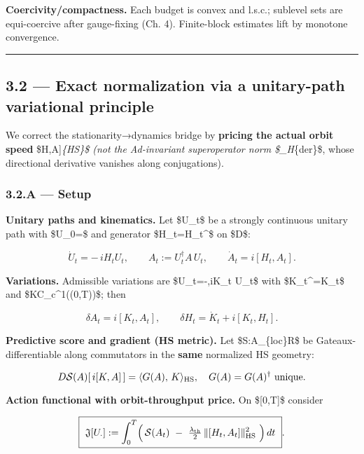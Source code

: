 \documentclass[
]{article}
\numberwithin{equation}{section}
\begin{document}
\textbf{Coercivity/compactness.} Each budget is convex and l.s.c.;
sublevel sets are equi-coercive after gauge-fixing (Ch. 4). Finite-block
estimates lift by monotone convergence.

\begin{center}\rule{0.5\linewidth}{0.5pt}\end{center}

\hypertarget{exact-normalization-via-a-unitary-path-variational-principle}{%
\subsection{3.2 --- Exact normalization via a unitary-path variational
principle}\label{exact-normalization-via-a-unitary-path-variational-principle}}

We correct the stationarity→dynamics bridge by \textbf{pricing the
actual orbit speed} \$\textbar{[}H,A{]}\textbar{}\emph{\{\rm HS\}\$ (not
the Ad-invariant superoperator norm
\$\textbar{}\delta\_H\textbar{}}\{\rm der\}\$, whose directional
derivative vanishes along conjugations).

\hypertarget{a-setup}{%
\subsubsection{3.2.A --- Setup}\label{a-setup}}

\textbf{Unitary paths and kinematics.} Let \$U\_t\$ be a strongly
continuous unitary path with \$U\_0=\$ and generator
\$H\_t=H\_t\^{}\dagger\$ on \$\mathcal D\$:

\[
\dot U_t=-\,iH_tU_t,\qquad A_t:=U_t^\dagger A\,U_t,\qquad \dot A_t=i[H_t,A_t].
\]

\textbf{Variations.} Admissible variations are \$\delta U\_t=-,iK\_t
U\_t\$ with \$K\_t\^{}\dagger=K\_t\$ and \$K\in C\_c\^{}1((0,T))\$; then

\[
\delta A_t=i[K_t,A_t],\qquad \delta H_t=\dot K_t+i[K_t,H_t].
\]

\textbf{Predictive score and gradient (HS metric).} Let
\$\mathcal S:\mathcal A\_\{\rm loc\}\to\mathbb R\$ be
Gateaux-differentiable along commutators in the \textbf{same} normalized
HS geometry:

\[
D\mathcal S(A)[\,i[K,A]\,]=\langle G(A),\,K\rangle_{\rm HS},\quad G(A)=G(A)^\dagger\ \text{unique}.
\]

\textbf{Action functional with orbit-throughput price.} On \${[}0,T{]}\$
consider

\[
\boxed{\ \mathfrak J[U_\cdot]:=\int_0^T\!\Big(\,\mathcal S(A_t)\ -\ \tfrac{\lambda_{\rm th}}{2}\,\|[H_t,A_t]\|_{\rm HS}^2\ \Big)\,dt\ }.
\]
\end{document}
